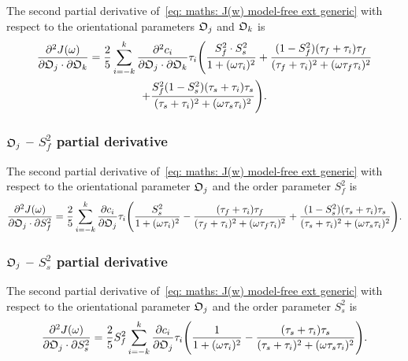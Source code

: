 The second partial derivative of~\eqref{eq: maths: J(w) model-free ext generic} with respect to the orientational parameters $\mathfrak{O}_j$ and $\mathfrak{O}_k$ is
\begin{multline}
    \frac{\partial^2 J(\omega)}{\partial \mathfrak{O}_j \cdot \partial \mathfrak{O}_k} = \frac{2}{5} \sum_{i=-k}^k
        \frac{\partial^2 c_i}{\partial \mathfrak{O}_j \cdot \partial \mathfrak{O}_k} \tau_i \Bigg(
            \frac{S^2_f \cdot S^2_s}{1 + (\omega \tau_i)^2}
            + \frac{(1 - S^2_f)(\tau_f + \tau_i)\tau_f}{(\tau_f + \tau_i)^2 + (\omega \tau_f \tau_i)^2} \\
            + \frac{S^2_f(1 - S^2_s)(\tau_s + \tau_i)\tau_s}{(\tau_s + \tau_i)^2 + (\omega \tau_s \tau_i)^2}
        \Bigg).
\end{multline}



\subsubsection{$\mathfrak{O}_j$ -- $S^2_f$ partial derivative}

The second partial derivative of~\eqref{eq: maths: J(w) model-free ext generic} with respect to the orientational parameter $\mathfrak{O}_j$ and the order parameter $S^2_f$ is
\begin{equation}
    \frac{\partial^2 J(\omega)}{\partial \mathfrak{O}_j \cdot \partial S^2_f} = \frac{2}{5} \sum_{i=-k}^k \frac{\partial c_i}{\partial \mathfrak{O}_j} \tau_i \Bigg(
        \frac{S^2_s}{1 + (\omega \tau_i)^2}
        - \frac{(\tau_f + \tau_i)\tau_f}{(\tau_f + \tau_i)^2 + (\omega \tau_f \tau_i)^2}
        + \frac{(1 - S^2_s)(\tau_s + \tau_i)\tau_s}{(\tau_s + \tau_i)^2 + (\omega \tau_s \tau_i)^2}
    \Bigg).
\end{equation}



\subsubsection{$\mathfrak{O}_j$ -- $S^2_s$ partial derivative}

The second partial derivative of~\eqref{eq: maths: J(w) model-free ext generic} with respect to the orientational parameter $\mathfrak{O}_j$ and the order parameter $S^2_s$ is
\begin{equation}
    \frac{\partial^2 J(\omega)}{\partial \mathfrak{O}_j \cdot \partial S^2_s} = \frac{2}{5} S^2_f \sum_{i=-k}^k \frac{\partial c_i}{\partial \mathfrak{O}_j} \tau_i \Bigg(
        \frac{1}{1 + (\omega \tau_i)^2}
        - \frac{(\tau_s + \tau_i)\tau_s}{(\tau_s + \tau_i)^2 + (\omega \tau_s \tau_i)^2}
    \Bigg).
\end{equation}



